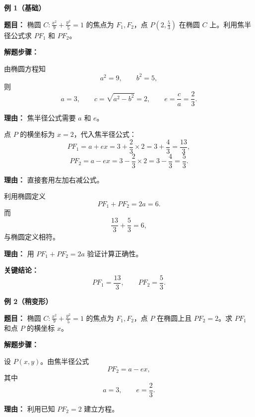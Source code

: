 \begin{examplebox}
	\textbf{\textcolor{CExample}{例 1（基础）}}

	\textbf{\textcolor{CExample}{题目：}} 椭圆 $C:\frac{x^2}{9}+\frac{y^2}{5}=1$ 的焦点为 $F_1,F_2$，点 $P(2,\frac{5}{3})$ 在椭圆 $C$ 上。利用焦半径公式求 $PF_1$ 和 $PF_2$。

	\textbf{\textcolor{CExample}{解题步骤：}}
	\begin{description}[style=nextline, leftmargin=2.8em, labelsep=0.5em, itemsep=0.45em]
		\item[\textbf{第一步（确定参数）：}] 由椭圆方程知
		      \[
			      a^2=9,\qquad b^2=5,
		      \]
		      则
		      \[
			      a=3,\qquad c=\sqrt{a^2-b^2}=2,\qquad e=\frac{c}{a}=\frac{2}{3}.
		      \]
		      \par\textbf{理由：} 焦半径公式需要 $a$ 和 $e$。

		\item[\textbf{第二步（代入公式）：}] 点 $P$ 的横坐标为 $x=2$，代入焦半径公式：
		      \[
			      PF_1=a+ex=3+\frac{2}{3}\times 2
			      =3+\frac{4}{3}
			      =\frac{13}{3},
		      \]
		      \[
			      PF_2=a-ex=3-\frac{2}{3}\times 2
			      =3-\frac{4}{3}
			      =\frac{5}{3}.
		      \]
		      \par\textbf{理由：} 直接套用左加右减公式。

		\item[\textbf{第三步（验证结果）：}] 利用椭圆定义
		      \[
			      PF_1+PF_2=2a=6.
		      \]
		      而
		      \[
			      \frac{13}{3}+\frac{5}{3}=6,
		      \]
		      与椭圆定义相符。
		      \par\textbf{理由：} 用 $PF_1+PF_2=2a$ 验证计算正确性。
	\end{description}

	\textbf{\textcolor{CExample}{关键结论：}}
	\[
		PF_1=\frac{13}{3},\qquad PF_2=\frac{5}{3}.
	\]

	\medskip
	\textbf{\textcolor{CExample}{例 2（稍变形）}}

	\textbf{\textcolor{CExample}{题目：}} 椭圆 $C:\frac{x^2}{9}+\frac{y^2}{5}=1$ 的焦点为 $F_1,F_2$，点 $P$ 在椭圆上且 $PF_2=2$。求 $PF_1$ 和点 $P$ 的横坐标 $x$。

	\textbf{\textcolor{CExample}{解题步骤：}}
	\begin{description}[style=nextline, leftmargin=2.8em, labelsep=0.5em, itemsep=0.45em]
		\item[\textbf{第一步（设横坐标 $x$）：}] 设 $P(x,y)$。由焦半径公式
		      \[
			      PF_2=a-ex,
		      \]
		      其中
		      \[
			      a=3,\qquad e=\frac{2}{3}.
		      \]
		      \par\textbf{理由：} 利用已知 $PF_2=2$ 建立方程。


\end{description}
\end{examplebox}
